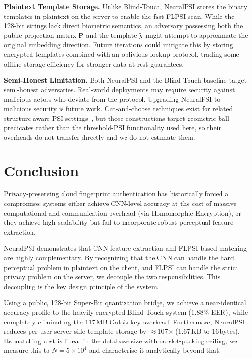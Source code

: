 \documentclass[11pt,a4paper]{article}
\begin{document}
\textbf{Plaintext Template Storage.} Unlike Blind-Touch, NeuralPSI stores the binary templates in plaintext on the server to enable the fast FLPSI scan. While the 128-bit strings lack direct biometric semantics, an adversary possessing both the public projection matrix $\mathbf{P}$ and the template $\tilde{\mathbf{y}}$ might attempt to approximate the original embedding direction. Future iterations could mitigate this by storing encrypted templates combined with an oblivious lookup protocol, trading some offline storage efficiency for stronger data-at-rest guarantees.

\textbf{Semi-Honest Limitation.} Both NeuralPSI and the Blind-Touch baseline target semi-honest adversaries. Real-world deployments may require security against malicious actors who deviate from the protocol. Upgrading NeuralPSI to malicious security is future work. Cut-and-choose techniques exist for related structure-aware PSI settings~\cite{GarimellaEtAl23}, but those constructions target geometric-ball predicates rather than the threshold-PSI functionality used here, so their overheads do not transfer directly and we do not estimate them.

\section{Conclusion}



Privacy-preserving cloud fingerprint authentication has historically forced a compromise: systems either achieve CNN-level accuracy at the cost of massive computational and communication overhead (via Homomorphic Encryption), or they achieve high scalability but fail to incorporate robust perceptual feature extraction.

NeuralPSI demonstrates that CNN feature extraction and FLPSI-based matching are highly complementary. By recognizing that the CNN can handle the hard perceptual problem in plaintext on the client, and FLPSI can handle the strict privacy problem on the server, we decouple the two responsibilities. This decoupling is the key design principle of the system. 

Using a public, 128-bit Super-Bit quantization bridge, we achieve a near-identical accuracy profile to the heavily-encrypted Blind-Touch system ($1.88\%$ EER), while completely eliminating the 117\,MB Galois key overhead. Furthermore, NeuralPSI reduces per-user server-side template storage by $\approx$107$\times$ (1.67\,KB to 16\,bytes). Its matching cost is linear in the database size with no slot-packing ceiling; we measure this to $N=5\times10^4$ and characterise it analytically beyond that.
\end{document}
